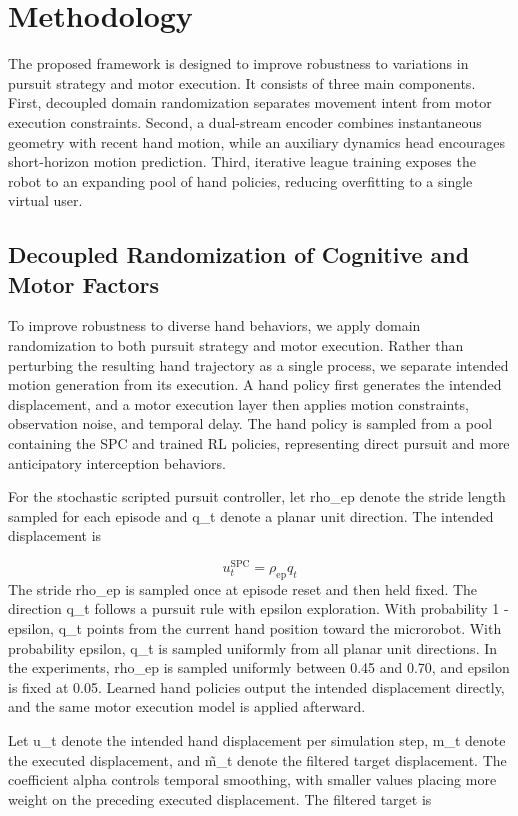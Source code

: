 \documentclass[letterpaper,journal]{IEEEtran}
\begin{document}
\section{Methodology}
The proposed framework is designed to improve robustness to variations in pursuit strategy and motor execution. It consists of three main components. First, decoupled domain randomization separates movement intent from motor execution constraints. Second, a dual-stream encoder combines instantaneous geometry with recent hand motion, while an auxiliary dynamics head encourages short-horizon motion prediction. Third, iterative league training exposes the robot to an expanding pool of hand policies, reducing overfitting to a single virtual user.

\subsection{Decoupled Randomization of Cognitive and Motor Factors}
To improve robustness to diverse hand behaviors, we apply domain randomization to both pursuit strategy and motor execution. Rather than perturbing the resulting hand trajectory as a single process, we separate intended motion generation from its execution. A hand policy first generates the intended displacement, and a motor execution layer then applies motion constraints, observation noise, and temporal delay. The hand policy is sampled from a pool containing the SPC and trained RL policies, representing direct pursuit and more anticipatory interception behaviors.

For the stochastic scripted pursuit controller, let rho\_ep denote the stride length sampled for each episode and q\_t denote a planar unit direction. The intended displacement is

\begin{equation}
u_t^{\mathrm{SPC}} = \rho_{\mathrm{ep}} q_t
\end{equation}
The stride rho\_ep is sampled once at episode reset and then held fixed. The direction q\_t follows a pursuit rule with epsilon exploration. With probability 1 - epsilon, q\_t points from the current hand position toward the microrobot. With probability epsilon, q\_t is sampled uniformly from all planar unit directions. In the experiments, rho\_ep is sampled uniformly between 0.45 and 0.70, and epsilon is fixed at 0.05. Learned hand policies output the intended displacement directly, and the same motor execution model is applied afterward.

Let u\_t denote the intended hand displacement per simulation step, m\_t denote the executed displacement, and m̃\_t denote the filtered target displacement. The coefficient alpha controls temporal smoothing, with smaller values placing more weight on the preceding executed displacement. The filtered target is
\end{document}
